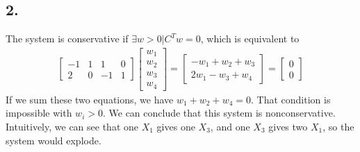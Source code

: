 \begin{flushleft}
\subsection*{2.}
The system is conservative if $\exists w>0 | C^Tw = 0$, which is equivalent to
\begin{eqnarray*}
\begin{bmatrix}
-1 & 1 & 1 &0\\
2 & 0 & -1 & 1
\end{bmatrix}
\begin{bmatrix}
w_1 \\
w_2\\
w_3\\
w_4
\end{bmatrix} = \begin{bmatrix}
-w_1+w_2+w_3 \\
2w_1-w_3+w_4
\end{bmatrix} = \begin{bmatrix}
0 \\
0
\end{bmatrix}
\end{eqnarray*}
If we sum these two equations, we have $w_1+w_2+w_4=0$. That condition is impossible with $w_i > 0$. We can conclude that this system is nonconservative. Intuitively, we can see that one $X_1$ gives one $X_3$, and one $X_3$ gives two $X_1$, so the system would explode.


\end{flushleft}
